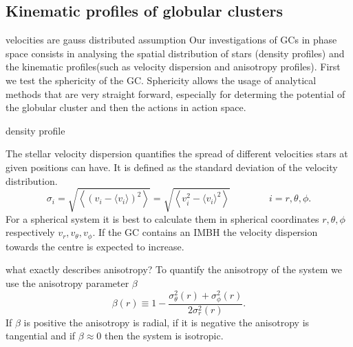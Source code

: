 \subsection{Kinematic profiles of globular clusters}\label{kin_prof_theory}
\color{red} velocities are gauss distributed assumption \color{black}
Our investigations of \acp{GC} in phase space consists in analysing the spatial distribution of stars (density profiles) and the kinematic profiles(such as velocity dispersion and anisotropy profiles). First we test the sphericity of the \ac{GC}. Sphericity allows the usage of analytical methods that are very straight forward, especially for determing the potential of the globular cluster and then the actions in action space.\par \color{red} density profile \color{black} \par The stellar velocity dispersion quantifies the spread of different velocities stars at given positions can have. It is defined as the standard deviation of the velocity distribution. 
\begin{equation}\label{eq:vel_disp}
\sigma_i=\sqrt{\left\langle(v_i-\langle v_i\rangle)^2\right\rangle}=\sqrt{\left\langle v_i^2-\langle v_i\rangle^2\right\rangle} \qquad\qquad i=r,\theta,\phi.
\end{equation} For a spherical system it is best to calculate them in spherical coordinates \(r,\theta,\phi\) respectively \(v_r,v_{\theta},v_{\phi}\). If the \ac{GC} contains an \ac{IMBH} the velocity dispersion towards the centre is expected to increase. 
\par \color{red} what exactly describes anisotropy? \color{black} To quantify the anisotropy of the system we use the anisotropy parameter \(\beta\) 
\begin{equation}\label{eq:anisotropy}
\beta(r)\equiv1-\frac{\sigma_\theta ^2(r)+\sigma_\phi ^2(r)}{2\sigma_r ^2(r)}.
\end{equation} If \(\beta\) is positive the anisotropy is radial, if it is negative the anisotropy is tangential and if \(\beta\approx0\) then the system is isotropic.
